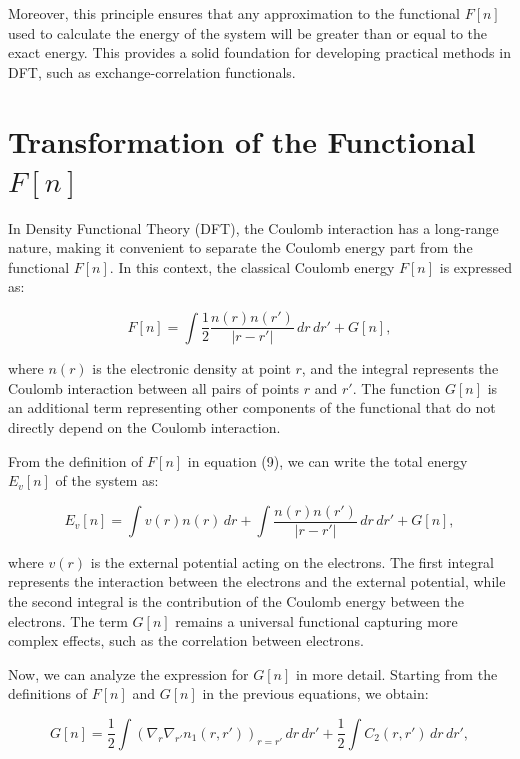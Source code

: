 \documentclass[%
 preprint, linenumbers,
 amsmath,amssymb,
 aps, physrev,
]{revtex4-2}
\begin{document}
Moreover, this principle ensures that any approximation to the functional \( F[n] \) used to calculate the energy of the system will be greater than or equal to the exact energy. This provides a solid foundation for developing practical methods in DFT, such as exchange-correlation functionals.

\section{\label{sec:level1}Transformation of the Functional \( F[n] \) }

In Density Functional Theory (DFT), the Coulomb interaction has a long-range nature, making it convenient to separate the Coulomb energy part from the functional \( F[n] \). In this context, the classical Coulomb energy \( F[n] \) is expressed as:

\begin{equation}
F[n] = \int \frac{1}{2} \frac{n(r) n(r')}{|r - r'|} \, dr \, dr' + G[n],
\end{equation}

where \( n(r) \) is the electronic density at point \( r \), and the integral represents the Coulomb interaction between all pairs of points \( r \) and \( r' \). The function \( G[n] \) is an additional term representing other components of the functional that do not directly depend on the Coulomb interaction.

From the definition of \( F[n] \) in equation (9), we can write the total energy \( E_v[n] \) of the system as:

\begin{equation}
E_v[n] = \int v(r) n(r) \, dr + \int \frac{n(r) n(r')}{|r - r'|} \, dr \, dr' + G[n],
\end{equation}

where \( v(r) \) is the external potential acting on the electrons. The first integral represents the interaction between the electrons and the external potential, while the second integral is the contribution of the Coulomb energy between the electrons. The term \( G[n] \) remains a universal functional capturing more complex effects, such as the correlation between electrons.

Now, we can analyze the expression for \( G[n] \) in more detail. Starting from the definitions of \( F[n] \) and \( G[n] \) in the previous equations, we obtain:

\begin{equation}
G[n] = \frac{1}{2} \int \left( \nabla_r \nabla_{r'} n_1(r, r') \right)_{r=r'} \, dr \, dr' + \frac{1}{2} \int C_2(r, r') \, dr \, dr',
\end{equation}
\end{document}

